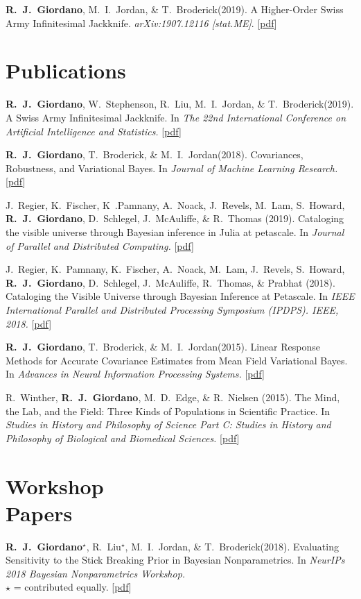 \documentclass[margin,line]{res}
\newcommand{\me}{\textbf{R.~J.~Giordano}\xspace}
\newcommand{\mestar}{\textbf{R.~J.~Giordano}$^{\star}$\xspace}
\newcommand{\tamara}{T.~Broderick\xspace}
\newcommand{\mike}{M.~I.~Jordan\xspace}
\newcommand{\runjing}{R.~Liu\xspace}
\newcommand{\runjingstar}{R.~Liu$^{\star}$\xspace}
\newcommand{\paperref}[1]{[\href{#1}{pdf}]}
\newcommand{\paperref}[1]{}
\begin{document}
\begin{resume}
\me, \mike, \& \tamara (2019).
A Higher-Order Swiss Army Infinitesimal Jackknife.
\emph{arXiv:1907.12116 [stat.ME]}.
\paperref{https://arxiv.org/abs/1907.12116}

\section{\sc Publications}

\me, W.~Stephenson, \runjing, \mike, \& \tamara (2019).  A Swiss Army Infinitesimal
Jackknife. In \emph{The 22nd International Conference on Artificial Intelligence
and Statistics.}
\paperref{https://arxiv.org/abs/1806.00550}

\me, \tamara, \& \mike (2018).  Covariances, Robustness, and Variational Bayes.
In \emph{Journal of Machine Learning Research.}
\paperref{https://arxiv.org/abs/1709.02536}

J.~Regier, K.~Fischer, K~.Pamnany, A.~Noack, J.~Revels, M.~Lam, S.~Howard,
\me, D.~Schlegel, J.~McAuliffe, \& R.~Thomas (2019). Cataloging the visible
universe through Bayesian inference in Julia at petascale. In \emph{Journal of
Parallel and Distributed Computing.}
\paperref{https://doi.org/10.1016/j.jpdc.2018.12.008}

J.~Regier, K.~Pamnany, K.~Fischer, A.~Noack, M.~Lam, J.~Revels, S.~Howard, \me,
D.~Schlegel, J.~McAuliffe, R.~Thomas, \& Prabhat (2018).  Cataloging the Visible
Universe through Bayesian Inference at Petascale.  In \emph{IEEE International
Parallel and Distributed Processing Symposium (IPDPS). IEEE, 2018.}
\paperref{https://arxiv.org/abs/1801.10277}

\me, \tamara, \& \mike (2015). Linear Response Methods for Accurate Covariance
Estimates from Mean Field Variational Bayes. In \emph{Advances in Neural
Information Processing Systems.}
\paperref{https://arxiv.org/abs/1506.04088}

R.~Winther, \me, M.~D.~Edge, \&  R.~Nielsen (2015).  The Mind, the Lab, and the
Field: Three Kinds of Populations in Scientific Practice.  In \emph{Studies in
History and Philosophy of Science Part C: Studies in History and Philosophy of
Biological and Biomedical Sciences.}
\paperref{https://doi.org/10.1016/j.shpsc.2015.01.009}


\section{\sc Workshop \\ Papers}

\mestar, \runjingstar, \mike, \& \tamara (2018).
Evaluating Sensitivity to the Stick Breaking Prior in Bayesian Nonparametrics.
In \emph{NeurIPs 2018 Bayesian Nonparametrics Workshop.}\\
$\star$ = contributed equally.
\paperref{https://arxiv.org/abs/1810.06587}


\end{resume}
\end{document}
